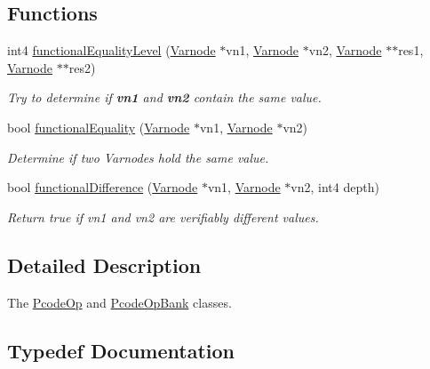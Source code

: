 \subsection*{Functions}
\begin{DoxyCompactItemize}
\item 
int4 \mbox{\hyperlink{op_8hh_a1761d74696f37bc47ecdbd773ddbabec}{functional\+Equality\+Level}} (\mbox{\hyperlink{class_varnode}{Varnode}} $\ast$vn1, \mbox{\hyperlink{class_varnode}{Varnode}} $\ast$vn2, \mbox{\hyperlink{class_varnode}{Varnode}} $\ast$$\ast$res1, \mbox{\hyperlink{class_varnode}{Varnode}} $\ast$$\ast$res2)
\begin{DoxyCompactList}\small\item\em Try to determine if {\bfseries{vn1}} and {\bfseries{vn2}} contain the same value. \end{DoxyCompactList}\item 
bool \mbox{\hyperlink{op_8hh_acabcf7c5d200986ab0afdbf80b7bd933}{functional\+Equality}} (\mbox{\hyperlink{class_varnode}{Varnode}} $\ast$vn1, \mbox{\hyperlink{class_varnode}{Varnode}} $\ast$vn2)
\begin{DoxyCompactList}\small\item\em Determine if two Varnodes hold the same value. \end{DoxyCompactList}\item 
bool \mbox{\hyperlink{op_8hh_aa4d21476a58095d82737e3bb10e64701}{functional\+Difference}} (\mbox{\hyperlink{class_varnode}{Varnode}} $\ast$vn1, \mbox{\hyperlink{class_varnode}{Varnode}} $\ast$vn2, int4 depth)
\begin{DoxyCompactList}\small\item\em Return true if vn1 and vn2 are verifiably different values. \end{DoxyCompactList}\end{DoxyCompactItemize}


\subsection{Detailed Description}
The \mbox{\hyperlink{class_pcode_op}{Pcode\+Op}} and \mbox{\hyperlink{class_pcode_op_bank}{Pcode\+Op\+Bank}} classes. 



\subsection{Typedef Documentation}
\mbox{\label{op_8hh_abaa8ab6f8d0f797e72a3cb80ff40e7fa}} 
